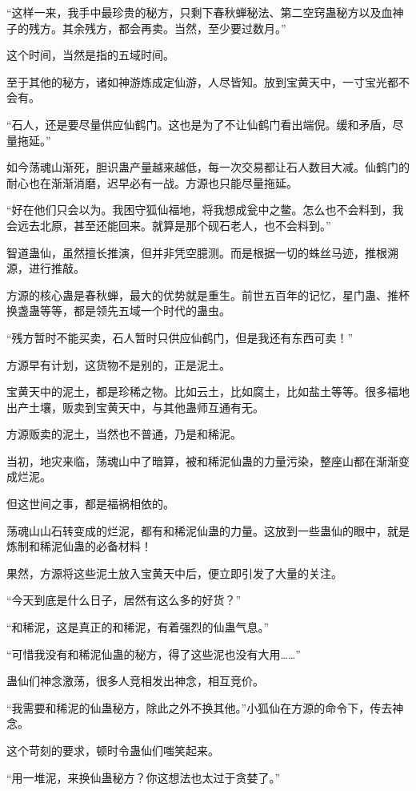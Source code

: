 \begin{this_body}
“这样一来，我手中最珍贵的秘方，只剩下春秋蝉秘法、第二空窍蛊秘方以及血神子的残方。其余残方，都会再卖。当然，至少要过数月。”

这个时间，当然是指的五域时间。

至于其他的秘方，诸如神游炼成定仙游，人尽皆知。放到宝黄天中，一寸宝光都不会有。

“石人，还是要尽量供应仙鹤门。这也是为了不让仙鹤门看出端倪。缓和矛盾，尽量拖延。”

如今荡魂山渐死，胆识蛊产量越来越低，每一次交易都让石人数目大减。仙鹤门的耐心也在渐渐消磨，迟早必有一战。方源也只能尽量拖延。

“好在他们只会以为。我困守狐仙福地，将我想成瓮中之鳖。怎么也不会料到，我会远去北原，甚至还能回来。就算是那个砚石老人，也不会料到。”

智道蛊仙，虽然擅长推演，但并非凭空臆测。而是根据一切的蛛丝马迹，推根溯源，进行推敲。

方源的核心蛊是春秋蝉，最大的优势就是重生。前世五百年的记忆，星门蛊、推杯换盏蛊等等，都是领先五域一个时代的蛊虫。

“残方暂时不能买卖，石人暂时只供应仙鹤门，但是我还有东西可卖！”

方源早有计划，这货物不是别的，正是泥土。

宝黄天中的泥土，都是珍稀之物。比如云土，比如腐土，比如盐土等等。很多福地出产土壤，贩卖到宝黄天中，与其他蛊师互通有无。

方源贩卖的泥土，当然也不普通，乃是和稀泥。

当初，地灾来临，荡魂山中了暗算，被和稀泥仙蛊的力量污染，整座山都在渐渐变成烂泥。

但这世间之事，都是福祸相依的。

荡魂山山石转变成的烂泥，都有和稀泥仙蛊的力量。这放到一些蛊仙的眼中，就是炼制和稀泥仙蛊的必备材料！

果然，方源将这些泥土放入宝黄天中后，便立即引发了大量的关注。

“今天到底是什么日子，居然有这么多的好货？”

“和稀泥，这是真正的和稀泥，有着强烈的仙蛊气息。”

“可惜我没有和稀泥仙蛊的秘方，得了这些泥也没有大用……”

蛊仙们神念激荡，很多人竞相发出神念，相互竞价。

“我需要和稀泥的仙蛊秘方，除此之外不换其他。”小狐仙在方源的命令下，传去神念。

这个苛刻的要求，顿时令蛊仙们嗤笑起来。

“用一堆泥，来换仙蛊秘方？你这想法也太过于贪婪了。”


\end{this_body}
